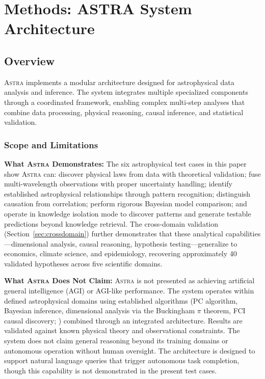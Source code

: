 \documentclass[usenatbib]{rasti}
\newcommand{\astra}{\textsc{Astra}\xspace}
\newcommand{\pc}{PC\xspace}
\newcommand{\fci}{FCI\xspace}
\begin{document}
\section{Methods: ASTRA System Architecture}
\label{sec:methods}

\subsection{Overview}
\label{sec:methods:overview}

\astra implements a modular architecture designed for astrophysical data analysis and inference.
The system integrates multiple specialized components through a coordinated framework, enabling complex multi-step analyses that combine data processing, physical reasoning, causal inference, and statistical validation.

\subsubsection{Scope and Limitations}
\label{sec:scope}

\textbf{What \astra Demonstrates:}
The six astrophysical test cases in this paper show \astra can: discover physical laws from data with theoretical validation; fuse multi-wavelength observations with proper uncertainty handling; identify established astrophysical relationships through pattern recognition; distinguish causation from correlation; perform rigorous Bayesian model comparison; and operate in knowledge isolation mode to discover patterns and generate testable predictions beyond knowledge retrieval.
The cross-domain validation (Section~\ref{sec:crossdomain}) further demonstrates that these analytical capabilities---dimensional analysis, causal reasoning, hypothesis testing---generalize to economics, climate science, and epidemiology, recovering approximately 40 validated hypotheses across five scientific domains.

\textbf{What \astra Does Not Claim:}
\astra is not presented as achieving artificial general intelligence (AGI) or AGI-like performance.
The system operates within defined astrophysical domains using established algorithms (\pc algorithm, Bayesian inference, dimensional analysis via the Buckingham $\pi$ theorem, \fci causal discovery; \citealt{Zhang2008}) combined through an integrated architecture.
Results are validated against known physical theory and observational constraints.
The system does not claim general reasoning beyond its training domains or autonomous operation without human oversight.
The architecture is designed to support natural language queries that trigger autonomous task completion, though this capability is not demonstrated in the present test cases.
\end{document}
